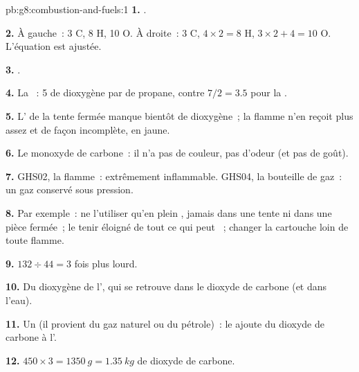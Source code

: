 \begin{solution}{pb:g8:combustion-and-fuels:1}
\textbf{1.} .

\textbf{2.} À gauche~: 3 C, 8 H, 10 O. À droite~: 3 C, $4 \times 2 = 8$ H,
$3 \times 2 + 4 = 10$ O. L'équation est ajustée.

\textbf{3.} .

\textbf{4.} La ~: 5  de dioxygène par
 de propane, contre $7/2 = 3.5$ pour la .

\textbf{5.} L' de la tente fermée manque bientôt de dioxygène~; la
flamme n'en reçoit plus assez et  de façon incomplète, en jaune.

\textbf{6.} Le monoxyde de carbone~: il n'a pas de couleur, pas d'odeur
(et pas de goût).

\textbf{7.} GHS02, la flamme~: extrêmement inflammable. GHS04, la
bouteille de gaz~: un gaz conservé sous pression.

\textbf{8.} Par exemple~: ne l'utiliser qu'en plein , jamais dans une
tente ni dans une pièce fermée~; le tenir éloigné de tout ce qui peut
~; changer la cartouche loin de toute flamme.

\textbf{9.} $132 \div 44 = 3$ fois plus lourd.

\textbf{10.} Du dioxygène de l', qui se retrouve dans le dioxyde de
carbone (et dans l'eau).

\textbf{11.} Un  (il provient du gaz naturel ou du
pétrole)~: le  ajoute du dioxyde de carbone à l'.

\textbf{12.} $450 \times 3 = \qty{1350}{g} = \qty{1.35}{kg}$ de dioxyde
de carbone.
\end{solution}
